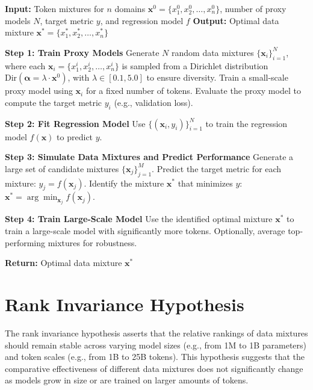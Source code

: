 \documentclass{article}
\theoremstyle{definition}
\theoremstyle{remark}
\newcommand{\ourmethod}{\textsc{RegMix}\xspace}
\begin{document}
\begin{algorithm}[htbp]
\caption{\ourmethod: Data Mixture as Regression}
\label{alg:regmix}
\begin{algorithmic}[1]
\STATE \textbf{Input:} Token mixtures for $n$ domains $\mathbf{x}^0 = \{x_1^0, x_2^0, \dots, x_n^0\}$, number of proxy models $N$, target metric $y$, and regression model $f$
\STATE \textbf{Output:} Optimal data mixture $\mathbf{x}^* = \{x_1^*, x_2^*, \dots, x_n^*\}$

\STATE \textbf{Step 1: Train Proxy Models}
\STATE Generate $N$ random data mixtures $\{\mathbf{x}_i\}_{i=1}^N$, where each $\mathbf{x}_i = \{x_1^i, x_2^i, \dots, x_n^i\}$ is sampled from a Dirichlet distribution $\text{Dir}(\mathbf{\alpha} = \lambda \cdot \mathbf{x}^0)$, with $\lambda \in [0.1, 5.0]$ to ensure diversity.
    \STATE Train a small-scale proxy model using $\mathbf{x}_i$ for a fixed number of tokens.
    \STATE Evaluate the proxy model to compute the target metric $y_i$ (e.g., validation loss).
\ENDFOR

\STATE \textbf{Step 2: Fit Regression Model}
\STATE Use $\{(\mathbf{x}_i, y_i)\}_{i=1}^N$ to train the regression model $f(\mathbf{x})$ to predict $y$.

\STATE \textbf{Step 3: Simulate Data Mixtures and Predict Performance}
\STATE Generate a large set of candidate mixtures $\{\mathbf{x}_j\}_{j=1}^M$.
\STATE Predict the target metric for each mixture: $y_j = f(\mathbf{x}_j)$.
\STATE Identify the mixture $\mathbf{x}^*$ that minimizes $y$: $\mathbf{x}^* = \arg\min_{\mathbf{x}_j} f(\mathbf{x}_j)$.

\STATE \textbf{Step 4: Train Large-Scale Model}
\STATE Use the identified optimal mixture $\mathbf{x}^*$ to train a large-scale model with significantly more tokens. Optionally, average top-performing mixtures for robustness.

\STATE \textbf{Return:} Optimal data mixture $\mathbf{x}^*$
\end{algorithmic}
\end{algorithm}

\clearpage

\section{Rank Invariance Hypothesis}

The rank invariance hypothesis asserts that the relative rankings of data mixtures should remain stable across varying model sizes (e.g., from 1M to 1B parameters) and token scales (e.g., from 1B to 25B tokens). 
This hypothesis suggests that the comparative effectiveness of different data mixtures does not significantly change as models grow in size or are trained on larger amounts of tokens.
\end{document}
